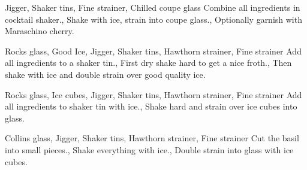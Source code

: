 \documentclass[../main.tex]{subfiles}
\begin{document}
\clearpage
{}

{Jigger, Shaker tins, Fine strainer, Chilled coupe glass}
{
    Combine all ingredients in cocktail shaker.,
    {Shake with ice, strain into coupe glass.},
    Optionally garnish with Maraschino cherry.
}

\cocktailDivider

{Rocks glass, Good Ice, Jigger, Shaker tins, Hawthorn strainer, Fine strainer}
{
    {Add all ingredients to a shaker tin.},
    {First dry shake hard to get a nice froth.},
    {Then shake with ice and double strain over good quality ice.}
}

\cocktailDivider

{Rocks glass, Ice cubes, Jigger, Shaker tins, Hawthorn strainer, Fine strainer}
{
    {Add all ingredients to shaker tin with ice.},
    {Shake hard and strain over ice cubes into glass.}
}

\cocktailDivider

{Collins glass, Jigger, Shaker tins, Hawthorn strainer, Fine strainer}
{
    {Cut the basil into small pieces.},
    {Shake everything with ice.},
    {Double strain into glass with ice cubes.}
}

\pagebreak

\end{document}

